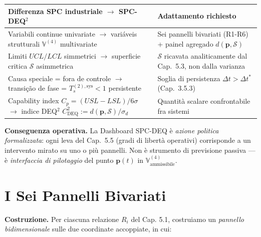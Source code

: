 {\def\LTcaptype{none} %
{\small\begin{longtable}[]{@{}
  >{\raggedright\arraybackslash}p{}
  >{\raggedright\arraybackslash}p{}@{}}
\toprule\noalign{}
\begin{minipage}[b]{\linewidth}\raggedright
Differenza SPC industriale $\to$ SPC-DEQ$^2$
\end{minipage} & \begin{minipage}[b]{\linewidth}\raggedright
Adattamento richiesto
\end{minipage} \\
\midrule\noalign{}
\endhead
\bottomrule\noalign{}
\endlastfoot
Variabili continue univariate $\to$ variáveis strutturali
\(\mathbb{V}^{(4)}\) multivariate & Sei pannelli bivariati (R1-R6) +
painel agregado \(d(\boldsymbol{p}, \mathcal{S})\) \\
Limiti \(UCL/LCL\) simmetrici $\to$ superficie critica \(\mathcal{S}\)
asimmetrica & \(\mathcal{S}\) ricavata analiticamente dal Cap.~5.3, non
dalla varianza \\
Causa speciale = fora de controle $\to$ transição de fase =
\(T_s^{(2),\text{sys}} < 1\) persistente & Soglia di persistenza
\(\Delta t > \Delta t^*\) (Cap.~3.5.3) \\
Capability index \(C_p = (USL-LSL)/6\sigma\) $\to$ indice DEQ$^2$
\(C_{\text{DEQ}}^2 := d(\boldsymbol{p}, \mathcal{S}) / \sigma_d\) &
Quantità scalare confrontabile fra sistemi \\
\end{longtable}}
}

\Proved{} \textbf{Conseguenza operativa.} La Dashboard SPC-DEQ è
\emph{azione politica formalizzata}: ogni leva del Cap.~5.5 (gradi di
libertà operativi) corrisponde a un intervento mirato su uno o più
pannelli. Non è strumento di previsione passiva --- è \emph{interfaccia
di pilotaggio} del punto \(\boldsymbol{p}(t)\) in
\(\mathbb{V}^{(4)}_{\text{ammissibile}}\).



\section{I Sei Pannelli Bivariati}\label{i-sei-pannelli-bivariati}

\Hypoth{} \textbf{Costruzione.} Per ciascuna relazione \(R_i\) del Cap.
5.1, costruiamo un \emph{pannello bidimensionale} sulle due coordinate
accoppiate, in cui:

